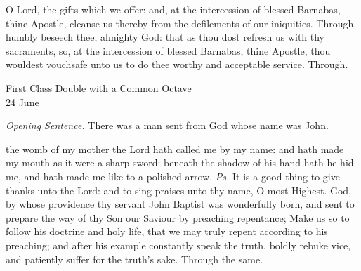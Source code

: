 \secret
{} O Lord, the gifts which we offer: and, at the intercession of blessed Barnabas, thine Apostle, cleanse us thereby from the defilements of our iniquities. Through.
\postcommunion
{} humbly beseech thee, almighty God: that as thou dost refresh us with thy sacraments, so, at the intercession of blessed Barnabas, thine Apostle, thou wouldest vouchsafe unto us to do thee worthy and acceptable service. Through.

\label{StJohnBaptist}
\begin{inhead}
    {First Class Double with a Common Octave\\
24 June}
\end{inhead}
\par\noindent
\textit{Opening Sentence.} There was a man sent from God whose name was John.



\introit
{} the womb of my mother the Lord hath called me by my name: and hath made my mouth as it were a sharp sword: beneath the shadow of his hand hath he hid me, and hath made me like to a polished arrow. \textit{Ps.} It is a good thing to give thanks unto the Lord: and to sing praises unto thy name, O most Highest.
\collect
\label{JohnCollect}
 God, by whose providence thy servant John Baptist was wonderfully born, and sent to prepare the way of thy Son our Saviour by preaching repentance; Make us so to follow his doctrine and holy life, that we may truly repent according to his preaching; and after his example constantly speak the truth, boldly rebuke vice, and patiently suffer for the truth's sake. Through the same.

